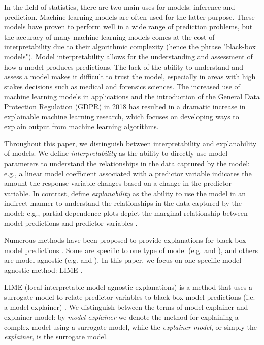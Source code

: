 \documentclass[AMS,STIX2COL]{WileyNJD-v2}\usepackage[]{graphicx}\usepackage[]{color}
\begin{document}
In the field of statistics, there are two main uses for models: inference and prediction. Machine learning models are often used for the latter purpose. These models have proven to perform well in a wide range of prediction problems, but the accuracy of many machine learning models comes at the cost of interpretability due to their algorithmic complexity (hence the phrase "black-box models"). Model interpretability allows for the understanding and assessment of how a model produces predictions. The lack of the ability to understand and assess a model makes it difficult to trust the model, especially in areas with high stakes decisions such as medical and forensics sciences. The increased use of machine learning models in applications and the introduction of the General Data Protection Regulation (GDPR) in 2018 \citep{goodman:2016} has resulted in a dramatic increase in explainable machine learning research, which focuses on developing ways to explain output from machine learning algorithms.

Throughout this paper, we distinguish between interpretability and explanability of models. We define {\it interpretability} as the ability to directly use model parameters to understand the relationships in the data captured by the model: e.g., a linear model coefficient associated with a predictor variable indicates the amount the response variable changes based on a change in the predictor variable. In contrast, define {\it explanability} as the ability to use the model in an indirect manner to understand the relationships in the data captured by the model: e.g., partial dependence plots depict the marginal relationship between model predictions and predictor variables \citep{friedman:2001}.

Numerous methods have been proposed to provide explanations for black-box model predictions \citep{gilpin:2018, guidotti:2018, ming:2017, molnar:2019}. Some are specific to one type of model (e.g. \citep{simonyan:2013} and \citep{urbanek:2008}), and others are model-agnostic (e.g. \citep{fisher:2018} and \citep{strumbelj:2014}). In this paper, we focus on one specific model-agnostic method: LIME \citep{ribeiro:2016}.

LIME (local interpretable model-agnostic explanations) is a method that uses a surrogate model to relate predictor variables to black-box model predictions (i.e. a model explainer) \citep{ribeiro:2016}. We distinguish between the terms of model explainer and explainer model: by \emph{model explainer} we denote the method for explaining a complex model using a surrogate model, while the \emph{explainer model}, or simply the \emph{explainer}, is the surrogate model.
\end{document}
